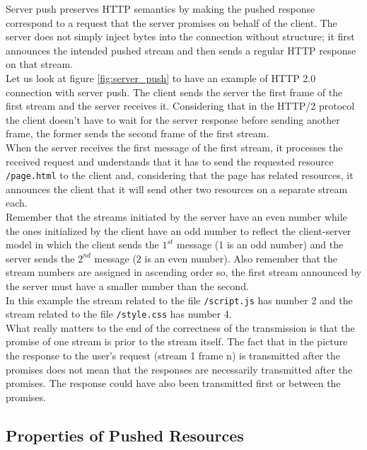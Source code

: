 \documentclass{scrbook}
\begin{document}
Server push preserves HTTP semantics by making the pushed response correspond to a request that the server promises on behalf of the client. The server does not simply inject bytes into the connection without structure; it first announces the intended pushed stream and then sends a regular HTTP response on that stream.\\

Let us look at figure \ref{fig:server_push} to have an example of HTTP 2.0 connection with server push. The client sends the server the first frame of the first stream and the server receives it. Considering that in the HTTP/2 protocol the client doesn't have to wait for the server response before sending another frame, the former sends the second frame of the first stream.\\

When the server receives the first message of the first stream, it processes the received request and understands that it has to send the requested resource \texttt{/page.html} to the client and, considering that the page has related resources, it announces the client that it will send other two resources on a separate stream each.\\

Remember that the streams initiated by the server have an even number while the ones initialized by the client have an odd number to reflect the client-server model in which the client sends the $1^{st}$ message (1 is an odd number) and the server sends the $2^{nd}$ message (2 is an even number). Also remember that the stream numbers are assigned in ascending order so, the first stream announced by the server must have a smaller number than the second.\\

In this example the stream related to the file \texttt{/script.js} has number 2 and the stream related to the file \texttt{/style.css} has number 4.\\

What really matters to the end of the correctness of the transmission is that the promise of one stream is prior to the stream itself. The fact that in the picture the response to the user's request (stream 1 frame n) is transmitted after the promises does not mean that the responses are necessarily transmitted after the promises. The response could have also been transmitted first or between the promises.

\subsection{Properties of Pushed Resources}
\end{document}
